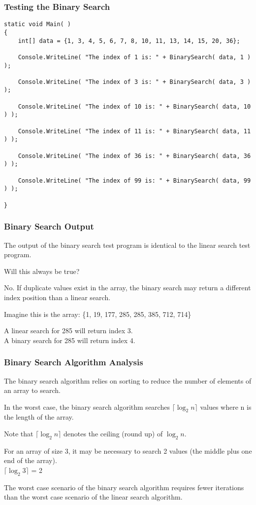 \begin{frame}[fragile]
\frametitle{Testing the Binary Search}

{\scriptsize
\begin{verbatim}
static void Main( )
{
    int[] data = {1, 3, 4, 5, 6, 7, 8, 10, 11, 13, 14, 15, 20, 36};

    Console.WriteLine( "The index of 1 is: " + BinarySearch( data, 1 ) );
    
    Console.WriteLine( "The index of 3 is: " + BinarySearch( data, 3 ) );
    
    Console.WriteLine( "The index of 10 is: " + BinarySearch( data, 10 ) );
    
    Console.WriteLine( "The index of 11 is: " + BinarySearch( data, 11 ) );
    
    Console.WriteLine( "The index of 36 is: " + BinarySearch( data, 36 ) );
    
    Console.WriteLine( "The index of 99 is: " + BinarySearch( data, 99 ) );
        
}
\end{verbatim}
}

\end{frame}

\begin{frame}
\frametitle{Binary Search Output}

The output of the binary search test program is identical to the linear search test program.

Will this always be true?

No. If duplicate values exist in the array, the binary search may return a different index position than a linear search.

Imagine this is the array: \{1, 19, 177, 285, 285, 385, 712, 714\}

A linear search for 285 will return index 3.\\
A binary search for 285 will return index 4. 

\end{frame}


\begin{frame}
\frametitle{Binary Search Algorithm Analysis}

The binary search algorithm relies on sorting to reduce the number of elements of an array to search.

In the worst case, the binary search algorithm searches $\lceil \log_{2}n\rceil$ values where n is the length of the array.

Note that $\lceil \log_{2}n\rceil$ denotes the ceiling (round up) of $\log_{2}n$.

For an array of size 3, it may be necessary to search 2 values (the middle plus one end of the array).\\
\quad   $\lceil \log_{2}3\rceil$ = 2

The worst case scenario of the binary search algorithm requires fewer iterations than the worst case scenario of the linear search algorithm.


\end{frame}

